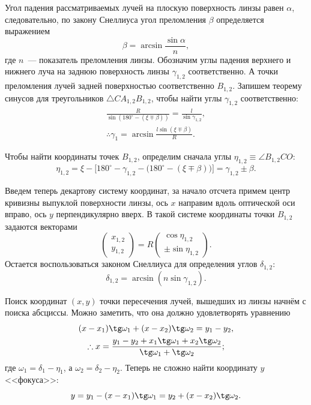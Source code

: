 Угол падения рассматриваемых лучей на плоскую поверхность линзы равен $\alpha$, следовательно, по закону Снеллиуса угол преломления $\beta$ определяется выражением
\begin{equation*}
    \beta = \arcsin \frac{\sin \alpha}{n},
\end{equation*}
где $n$~--- показатель преломления линзы. Обозначим углы падения верхнего и нижнего луча на заднюю поверхность линзы $\gamma_{1,2}$ соответственно. А точки преломления лучей задней поверхностью соответственно $B_{1,2}$. Запишем теорему синусов для треугольников $\triangle C A_{1,2} B_{1,2}$, чтобы найти углы $\gamma_{1,2}$ соответственно:
\begin{gather*}
    \frac{R}{\sin (180^\circ - (\xi \mp \beta))} = \frac{l}{\sin \gamma_{1,2}},\\
    \therefore \gamma_1 = \arcsin \frac{l\sin (\xi \mp \beta)}{R}.
\end{gather*}

Чтобы найти координаты точек $B_{1,2}$, определим сначала углы $ \eta_{1,2} \equiv \angle B_{1,2} C O$:
\begin{equation*}
    \eta_{1,2} = \xi - \Big[180^\circ - \gamma_{1,2} - \big(180^\circ - \left(\xi \mp \beta\right)\big)\Big] = \gamma_{1,2} \pm \beta.
\end{equation*}

Введем теперь декартову систему координат, за начало отсчета примем центр кривизны выпуклой поверхности линзы, ось $x$ направим вдоль оптической оси вправо, ось $y$ перпендикулярно вверх. В такой системе координаты точки $B_{1,2}$ задаются векторами
\begin{equation*}
    \begin{pmatrix}
        x_{1,2}\\
        y_{1,2}
    \end{pmatrix}
    = R
    \begin{pmatrix}
        \cos \eta_{1,2}\\
        \pm \sin \eta_{1,2}
    \end{pmatrix}.
\end{equation*}
Остается воспользоваться законом Снеллиуса для определения углов $\delta_{1,2}$:
\begin{equation*}
    \delta_{1,2} = \arcsin \left( n \sin \gamma_{1,2} \right).
\end{equation*}

Поиск координат  $(x,y)$ точки пересечения лучей, вышедших из линзы начнём с поиска абсциссы. Можно заметить, что она должно удовлетворять уравнению
\begin{gather*}
    (x - x_1) \tg \omega_1 + (x - x_2) \tg \omega_2 = y_1 - y_2,\\
    \therefore x = \frac{y_1 - y_2 + x_1\tg \omega_1 + x_2 \tg \omega_2}{\tg \omega_1 + \tg \omega_2};
\end{gather*}
где $\omega_1 = \delta_1 - \eta_1$, а $\omega_2 = \delta_2 - \eta_2$. Теперь не сложно найти координату $y$ <<фокуса>>:
\begin{equation*}
    y = y_1 - (x - x_1) \tg \omega_1 = y_2 + (x - x_2) \tg \omega_2.
\end{equation*}

